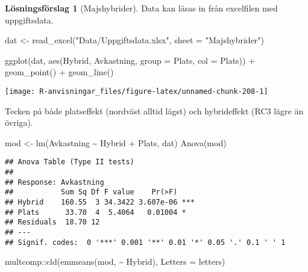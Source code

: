 \documentclass[
]{book}
\newenvironment{Shaded}{\begin{snugshade}}{\end{snugshade}}
\newcommand{\AttributeTok}[1]{\textcolor[rgb]{0.77,0.63,0.00}{#1}}
\newcommand{\FunctionTok}[1]{\textcolor[rgb]{0.00,0.00,0.00}{#1}}
\newcommand{\NormalTok}[1]{#1}
\newcommand{\OtherTok}[1]{\textcolor[rgb]{0.56,0.35,0.01}{#1}}
\newcommand{\SpecialCharTok}[1]{\textcolor[rgb]{0.00,0.00,0.00}{#1}}
\newcommand{\StringTok}[1]{\textcolor[rgb]{0.31,0.60,0.02}{#1}}
\theoremstyle{definition}
\theoremstyle{definition}
\theoremstyle{definition}
\theoremstyle{definition}
\newtheorem{hypothesis}{Lösningsförslag}[chapter]
\theoremstyle{remark}
\begin{document}
\begin{hypothesis}[Majshybrider]
Data kan läsas in från excelfilen med uppgiftsdata.

\begin{Shaded}
\begin{Highlighting}[]
\NormalTok{dat }\OtherTok{\textless{}{-}} \FunctionTok{read\_excel}\NormalTok{(}\StringTok{"Data/Uppgiftsdata.xlsx"}\NormalTok{, }\AttributeTok{sheet =} \StringTok{"Majshybrider"}\NormalTok{)}

\FunctionTok{ggplot}\NormalTok{(dat, }\FunctionTok{aes}\NormalTok{(Hybrid, Avkastning, }\AttributeTok{group =}\NormalTok{ Plats, }\AttributeTok{col =}\NormalTok{ Plats)) }\SpecialCharTok{+}
  \FunctionTok{geom\_point}\NormalTok{() }\SpecialCharTok{+}
  \FunctionTok{geom\_line}\NormalTok{()}
\end{Highlighting}
\end{Shaded}

\begin{center}\texttt{[image: R-anvisningar\_files/figure-latex/unnamed-chunk-208-1]} \end{center}

Tecken på både platseffekt (nordväst alltid lägst) och hybrideffekt (RC3 lägre än övriga).

\begin{Shaded}
\begin{Highlighting}[]
\NormalTok{mod }\OtherTok{\textless{}{-}} \FunctionTok{lm}\NormalTok{(Avkastning }\SpecialCharTok{\textasciitilde{}}\NormalTok{ Hybrid }\SpecialCharTok{+}\NormalTok{ Plats, dat)}
\FunctionTok{Anova}\NormalTok{(mod)}
\end{Highlighting}
\end{Shaded}

\begin{verbatim}
## Anova Table (Type II tests)
## 
## Response: Avkastning
##           Sum Sq Df F value    Pr(>F)    
## Hybrid    160.55  3 34.3422 3.607e-06 ***
## Plats      33.70  4  5.4064   0.01004 *  
## Residuals  18.70 12                      
## ---
## Signif. codes:  0 '***' 0.001 '**' 0.01 '*' 0.05 '.' 0.1 ' ' 1
\end{verbatim}

\begin{Shaded}
\begin{Highlighting}[]
\NormalTok{multcomp}\SpecialCharTok{::}\FunctionTok{cld}\NormalTok{(}\FunctionTok{emmeans}\NormalTok{(mod, }\SpecialCharTok{\textasciitilde{}}\NormalTok{ Hybrid), }\AttributeTok{Letters =}\NormalTok{ letters)}
\end{Highlighting}
\end{Shaded}


\end{hypothesis}
\end{document}
